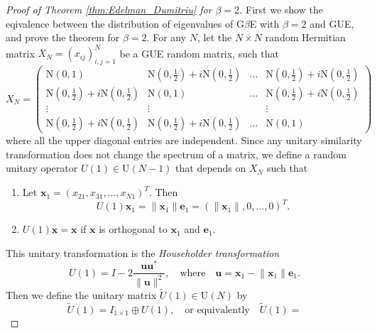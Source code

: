\documentclass[11pt, a4paper]{article}
\numberwithin{equation}{section}
\newcommand{\Unitary}{\mathrm{U}}
\newcommand{\Normal}{\mathrm{N}}
\renewcommand{\vec}[1]{\mathbf{#1}}
\theoremstyle{definition}
\theoremstyle{remark}
\begin{document}
\begin{proof}[Proof of Theorem \ref{thm:Edelman_Dumitriu} for $\beta = 2$]
  First we show the eqivalence between the distribution of eigenvalues of G$\beta$E with $\beta = 2$ and GUE, and prove the theorem for $\beta = 2$. For any $N$, let the $N \times N$ random Hermitian matrix $X_N = (x_{ij})^N_{i, j = 1}$ be a GUE random matrix, such that
  \begin{equation}
    X_N =
    \begin{pmatrix}
      \Normal(0, 1) & \Normal(0, \frac{1}{2}) + i \Normal(0, \frac{1}{2}) & \dots & \Normal(0, \frac{1}{2}) + i \Normal(0, \frac{1}{2}) \\
      \Normal(0, \frac{1}{2}) + i \Normal(0, \frac{1}{2}) & \Normal(0, 1) & \dots & \Normal(0, \frac{1}{2}) + i \Normal(0, \frac{1}{2}) \\
      \vdots & \vdots & & \vdots \\
      \Normal(0, \frac{1}{2}) + i \Normal(0, \frac{1}{2}) & \Normal(0, \frac{1}{2}) + i \Normal(0, \frac{1}{2}) & \dots & \Normal(0, 1)
    \end{pmatrix}
  \end{equation}
  where all the upper diagonal entries are independent. Since any unitary similarity transformation does not change the spectrum of a matrix, we define a random unitary operator $U(1) \in \Unitary(N - 1)$ that depends on $X_N$ such that
  \begin{enumerate}
  \item
    Let $\vec{x}_1 = (x_{21}, x_{31}, \dotsc, x_{N1})^T$. Then
    \begin{equation}
      U(1) \vec{x}_1 = \lVert \vec{x}_1 \rVert \vec{e}_1 = (\lVert \vec{x}_1 \rVert, 0, \dotsc, 0)^T.
    \end{equation}
  \item
    $U(1) \vec{x} = \vec{x}$ if $\vec{x}$ is orthogonal to $\vec{x}_1$ and $\vec{e}_1$.
  \end{enumerate}
  This unitary transformation is the \emph{Householder transformation} \cite[Section 2.2.4]{Horn-Johnson90}
  \begin{equation}
    U(1) = I - 2\frac{\vec{u}\vec{u}^*}{\lVert \vec{u} \rVert^2}, \quad \text{where} \quad \vec{u} = \vec{x}_1 - \lVert \vec{x}_1 \rVert \vec{e}_1.
  \end{equation}
  Then we define the unitary matrix $\tilde{U}(1) \in \Unitary(N)$ by
  \begin{equation}
    \tilde{U}(1) = I_{1 \times 1} \oplus U(1), \quad \text{or equivalently} \quad \tilde{U}(1) =

\end{equation}
\end{proof}
\end{document}
